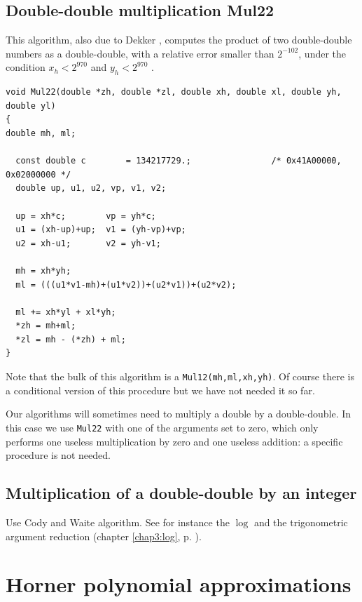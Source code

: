 \subsection{Double-double multiplication {Mul22}}
  
This algorithm, also due to Dekker \cite{Dek71}, computes the product of
two double-double numbers as a double-double, with a relative error
smaller than $2^{-102}$, under the condition $x_h<2^{970}$ and $y_h<2^{970}$ . 

\begin{lstlisting}[label={Mul22},caption={Mul22},firstnumber=1]
void Mul22(double *zh, double *zl, double xh, double xl, double yh, double yl)
{
double mh, ml;

  const double c        = 134217729.;                /* 0x41A00000, 0x02000000 */ 
  double up, u1, u2, vp, v1, v2;

  up = xh*c;        vp = yh*c;
  u1 = (xh-up)+up;  v1 = (yh-vp)+vp;
  u2 = xh-u1;       v2 = yh-v1;
  
  mh = xh*yh;
  ml = (((u1*v1-mh)+(u1*v2))+(u2*v1))+(u2*v2);

  ml += xh*yl + xl*yh;
  *zh = mh+ml;
  *zl = mh - (*zh) + ml;
}  
\end{lstlisting}

Note that the bulk of this algorithm is a \texttt{Mul12(mh,ml,xh,yh)}.
Of course there is a conditional version of this procedure but we have not needed it so far.

Our algorithms will sometimes need to multiply a double by a
double-double. In this case we use \texttt{Mul22} with one of the
arguments set to zero, which only performs one useless multiplication
by zero and one useless addition: a specific procedure is not needed.




\subsection{Multiplication of a double-double by an integer}


Use Cody and Waite algorithm. See for instance the $\log$ and the
trigonometric argument reduction (chapter \ref{chap3:log}, p. \pageref{chap3:log}).





\section{Horner polynomial approximations \label{sec:Horner}}

